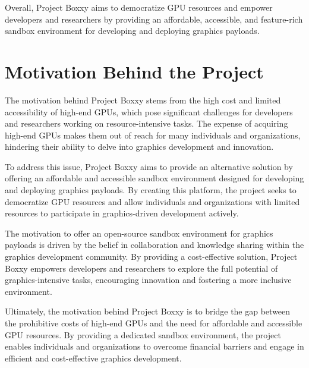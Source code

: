 Overall, Project Boxxy aims to democratize GPU resources and empower developers and researchers by providing an affordable, accessible, and feature-rich sandbox environment for developing and deploying graphics payloads.

\section{Motivation Behind the Project}

The motivation behind Project Boxxy stems from the high cost and limited accessibility of high-end GPUs, which pose significant challenges for developers and researchers working on resource-intensive tasks. The expense of acquiring high-end GPUs makes them out of reach for many individuals and organizations, hindering their ability to delve into graphics development and innovation.

To address this issue, Project Boxxy aims to provide an alternative solution by offering an affordable and accessible sandbox environment designed for developing and deploying graphics payloads.
By creating this platform, the project seeks to democratize GPU resources and allow individuals and organizations with limited resources to participate in graphics-driven development actively.

The motivation to offer an open-source sandbox environment for graphics payloads is driven by the belief in collaboration and knowledge sharing within the graphics development community.
By providing a cost-effective solution, Project Boxxy empowers developers and researchers to explore the full potential of graphics-intensive tasks, encouraging innovation and fostering a more inclusive environment.

Ultimately, the motivation behind Project Boxxy is to bridge the gap between the prohibitive costs of high-end GPUs and the need for affordable and accessible GPU resources.
By providing a dedicated sandbox environment, the project enables individuals and organizations to overcome financial barriers and engage in efficient and cost-effective graphics development.